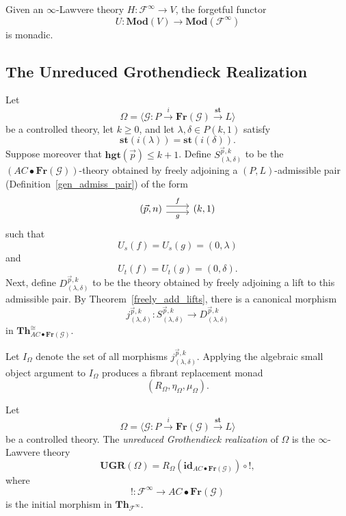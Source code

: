 \documentclass{tac}
\begin{document}
\begin{theorem}\label{forgetful functor is monadic}
Given an $\infty$-Lawvere theory $H:\mathcal{F}^\infty\to V$, the forgetful functor
\[
U:\mathbf{Mod}(V)\to\mathbf{Mod}(\mathcal{F}^\infty)
\]
is monadic.
\end{theorem}

\subsection*{The Unreduced Grothendieck Realization}
Let
\[
\Omega=\langle \mathcal{G}:P\xrightarrow{i}\mathbf{Fr}(\mathcal{G})\xrightarrow{\mathbf{st}}L\rangle
\]
be a controlled theory, let $k\geq 0$, and let $\lambda,\delta\in P(k,1)$ satisfy
\[
\mathbf{st}(i(\lambda))=\mathbf{st}(i(\delta)).
\]
Suppose moreover that $\mathbf{hgt}(\vec{p})\leq k+1$. Define $S^{\vec{p},k}_{(\lambda,\delta)}$ to be the $(AC\bullet\mathbf{Fr}(\mathcal{G}))$-theory obtained by freely adjoining a $(P,L)$-admissible pair (Definition~\ref{gen_admiss_pair}) of the form
\[
\begin{tikzcd}
	(\vec{p},n)\ar[r,shift left=.75ex,"f"]
	\ar[r,shift right=.75ex,swap,"g"]&
	(k,1)
\end{tikzcd}
\]
such that
\[
U_s(f)=U_s(g)=(0,\lambda)
\]
and
\[
U_t(f)=U_t(g)=(0,\delta).
\]
Next, define $D^{\vec{p},k}_{(\lambda,\delta)}$ to be the theory obtained by freely adjoining a lift to this admissible pair. By Theorem~\ref{freely_add_lifts}, there is a canonical morphism
\[
j^{\vec{p},k}_{(\lambda,\delta)}:
S^{\vec{p},k}_{(\lambda,\delta)}
\longrightarrow
D^{\vec{p},k}_{(\lambda,\delta)}
\]
in $\mathbf{Th}_{AC\bullet\mathbf{Fr}(\mathcal{G})}^{\cong}$.

Let $I_\Omega$ denote the set of all morphisms
$j^{\vec{p},k}_{(\lambda,\delta)}$. Applying the algebraic small object argument to $I_\Omega$ produces a fibrant replacement monad
\[
(R_\Omega,\eta_\Omega,\mu_\Omega).
\]

\begin{definition}
Let
\[
\Omega=\langle \mathcal{G}:P\xrightarrow{i}\mathbf{Fr}(\mathcal{G})\xrightarrow{\mathbf{st}}L\rangle
\]
be a controlled theory. The \emph{unreduced Grothendieck realization} of $\Omega$ is the $\infty$-Lawvere theory
\[
\mathbf{UGR}(\Omega)
=
R_\Omega(\mathbf{id}_{AC\bullet\mathbf{Fr}(\mathcal{G})})\circ !,
\]
where
\[
!:\mathcal{F}^\infty\to AC\bullet\mathbf{Fr}(\mathcal{G})
\]
is the initial morphism in $\mathbf{Th}_{\mathcal{F}^\infty}$.
\end{definition}
\end{document}
